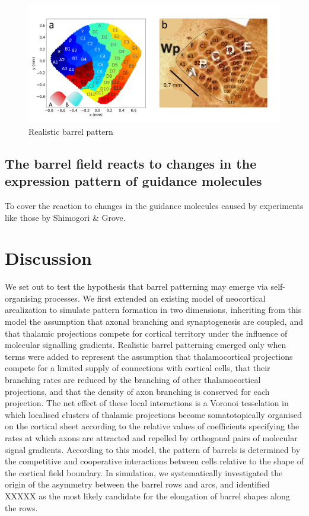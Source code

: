 \documentclass[9pt,twocolumn,twoside,lineno]{pnas-new}
\begin{document}
\begin{figure}
\begin{center}
\includegraphics[width=\textwidth]{../longpaper/realistic_barrels.png}
\end{center}
\caption{Realistic barrel pattern}
\label{fig:barrels}
\end{figure}

\subsection*{The barrel field reacts to changes in the expression pattern of guidance molecules}

To cover the reaction to changes in the guidance molecules caused by
experiments like those by Shimogori \& Grove.

\section*{Discussion}

We set out to test the hypothesis that barrel patterning may emerge via
self-organising processes. We first extended an existing model of neocortical
arealization to simulate pattern formation in two dimensions, inheriting from
this model the assumption that axonal branching and synaptogenesis are
coupled, and that thalamic projections compete for cortical territory under
the influence of molecular signalling gradients. Realistic barrel patterning
emerged only when terms were added to represent the assumption that
thalamocortical projections compete for a limited supply of connections with
cortical cells, that their branching rates are reduced by the branching of
other thalamocortical projections, and that the density of axon branching is
conserved for each projection. The net effect of these local interactions is a
Voronoi tesselation in which localised clusters of thalamic projections become
somatotopically organised on the cortical sheet according to the relative
values of coefficients specifying the rates at which axons are attracted and
repelled by orthogonal pairs of molecular signal gradients. According to this
model, the pattern of barrels is determined by the competitive and cooperative
interactions between cells relative to the shape of the cortical field
boundary. In simulation, we systematically investigated the origin of the
asymmetry between the barrel rows and arcs, and identified {\color{red} XXXXX}
as the most likely candidate for the elongation of barrel shapes along the
rows.


\end{document}
